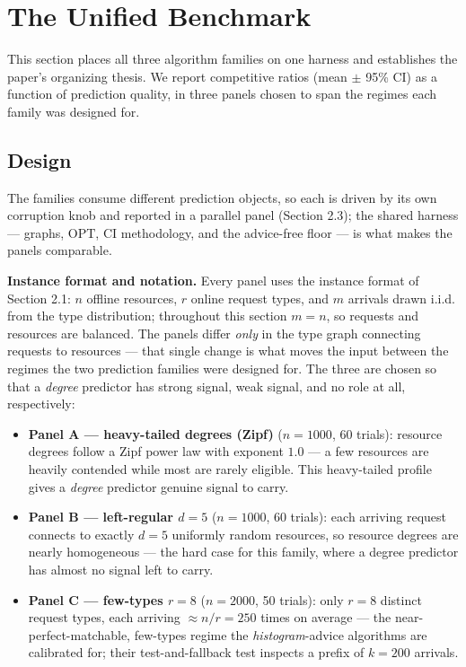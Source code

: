 \section{The Unified Benchmark}

This section places all three algorithm families on one harness and
establishes the paper's organizing thesis. We report competitive ratios
(mean \(\pm\) 95\% CI) as a function of prediction quality, in three
panels chosen to span the regimes each family was designed for.

\subsection{Design}

The families consume different prediction objects, so each is driven by
its own corruption knob and reported in a parallel panel (Section 2.3);
the shared harness --- graphs, \(\mathrm{OPT}\), CI methodology, and the
advice-free floor --- is what makes the panels comparable.

\textbf{Instance format and notation.} Every panel uses the instance
format of Section 2.1: \(n\) offline resources, \(r\) online request
types, and \(m\) arrivals drawn i.i.d. from the type distribution;
throughout this section \(m=n\), so requests and resources are balanced.
The panels differ \emph{only} in the type graph connecting requests to
resources --- that single change is what moves the input between the
regimes the two prediction families were designed for. The three are
chosen so that a \emph{degree} predictor has strong signal, weak signal,
and no role at all, respectively:

\begin{itemize}
\tightlist
\item
  \textbf{Panel A --- heavy-tailed degrees (Zipf)} (\(n=1000\), 60
  trials): resource degrees follow a Zipf power law with exponent
  \(1.0\) --- a few resources are heavily contended while most are
  rarely eligible. This heavy-tailed profile gives a \emph{degree}
  predictor genuine signal to carry.
\item
  \textbf{Panel B --- left-regular \(d{=}5\)} (\(n=1000\), 60 trials):
  each arriving request connects to exactly \(d=5\) uniformly random
  resources, so resource degrees are nearly homogeneous --- the hard
  case for this family, where a degree predictor has almost no signal
  left to carry.
\item
  \textbf{Panel C --- few-types \(r{=}8\)} (\(n=2000\), 50 trials): only
  \(r=8\) distinct request types, each arriving \(\approx n/r=250\)
  times on average --- the near-perfect-matchable, few-types regime the
  \emph{histogram}-advice algorithms are calibrated for; their
  test-and-fallback test inspects a prefix of \(k=200\) arrivals.
\end{itemize}


